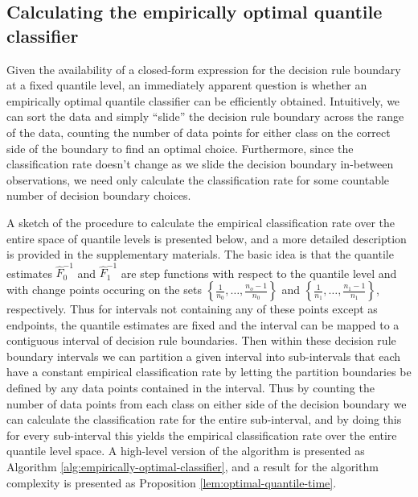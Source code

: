 \subsection{Calculating the empirically optimal quantile classifier}
\label{sec:empirically-optimal-algo}

Given the availability of a closed-form expression for the decision rule
boundary at a fixed quantile level, an immediately apparent question is whether
an empirically optimal quantile classifier can be efficiently obtained.
Intuitively, we can sort the data and simply ``slide'' the decision rule
boundary across the range of the data, counting the number of data points for
either class on the correct side of the boundary to find an optimal choice.
Furthermore, since the classification rate doesn't change as we slide the
decision boundary in-between observations, we need only calculate the
classification rate for some countable number of decision boundary choices.

A sketch of the procedure to calculate the empirical classification rate over
the entire space of quantile levels is presented below, and a more detailed
description is provided in the supplementary materials.  The basic idea is that
the quantile estimates $\hat{F}_0^{-1}$ and $\hat{F}_1^{-1}$ are step functions
with respect to the quantile level and with change points occuring on the sets
$\left\{\frac{1}{n_0}, \dots, \frac{n_o - 1}{n_0}\right\}$ and
$\left\{\frac{1}{n_1}, \dots, \frac{n_1 - 1}{n_1}\right\}$, respectively.  Thus
for intervals not containing any of these points except as endpoints, the
quantile estimates are fixed and the interval can be mapped to a contiguous
interval of decision rule boundaries.  Then within these decision rule boundary
intervals we can partition a given interval into sub-intervals that each have a
constant empirical classification rate by letting the partition boundaries be
defined by any data points contained in the interval.  Thus by counting the
number of data points from each class on either side of the decision boundary we
can calculate the classification rate for the entire sub-interval, and by doing
this for every sub-interval this yields the empirical classification rate over
the entire quantile level space.  A high-level version of the algorithm is
presented as Algorithm \ref{alg:empirically-optimal-classifier}, and a result
for the algorithm complexity is presented as Proposition
\ref{lem:optimal-quantile-time}.

